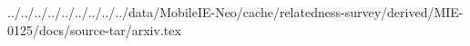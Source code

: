 ../../../../../../../../../data/MobileIE-Neo/cache/relatedness-survey/derived/MIE-0125/docs/source-tar/arxiv.tex